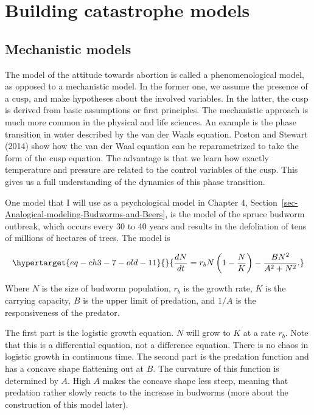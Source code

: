 \documentclass[
  a4paper,
  DIV=11,
  numbers=noendperiod]{scrreprt}
\begin{document}
\hypertarget{sec-Building-catastrophe-models}{%
\section{Building catastrophe
models}\label{sec-Building-catastrophe-models}}

\hypertarget{sec-Mechanistic-models}{%
\subsection{Mechanistic models}\label{sec-Mechanistic-models}}

The model of the attitude towards abortion is called a phenomenological
model, as opposed to a mechanistic model. In the former one, we assume
the presence of a cusp, and make hypotheses about the involved
variables. In the latter, the cusp is derived from basic assumptions or
first principles. The mechanistic approach is much more common in the
physical and life sciences. An example is the phase transition in water
described by the van der Waals equation. Poston and Stewart (2014) show
how the van der Waal equation can be reparametrized to take the form of
the cusp equation. The advantage is that we learn how exactly
temperature and pressure are related to the control variables of the
cusp. This gives us a full understanding of the dynamics of this phase
transition.

One model that I will use as a psychological model in Chapter 4,
Section~\ref{sec-Analogical-modeling-Budworms-and-Beers}, is the model
of the spruce budworm outbreak, which occurs every 30 to 40 years and
results in the defoliation of tens of millions of hectares of trees. The
model is

\begin{equation}\protect\hypertarget{eq-ch3-7-old-11}{}{
\frac{dN}{dt} = r_{b}N\left( 1 - \frac{N}{K} \right) - \frac{BN^{2}}{A^{2} + N^{2}}.
}\label{eq-ch3-7-old-11}\end{equation}

Where \(N\) is the size of budworm population, \(r_{b}\) is the growth
rate, \(K\) is the carrying capacity, \(B\) is the upper limit of
predation, and \(1/A\) is the responsiveness of the predator.

The first part is the logistic growth equation. \(N\) will grow to \(K\)
at a rate \(r_{b}\). Note that this is a differential equation, not a
difference equation. There is no chaos in logistic growth in continuous
time. The second part is the predation function and has a concave shape
flattening out at \(B\). The curvature of this function is determined by
\(A\). High \(A\) makes the concave shape less steep, meaning that
predation rather slowly reacts to the increase in budworms (more about
the construction of this model later).
\end{document}
